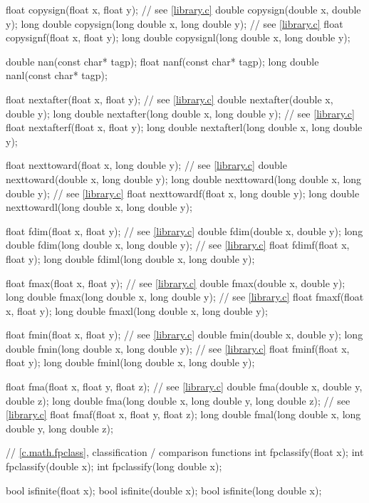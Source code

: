 \begin{codeblock}
{  float copysign(float x, float y);  // see \ref{library.c}
  double copysign(double x, double y);
  long double copysign(long double x, long double y);  // see \ref{library.c}
  float copysignf(float x, float y);
  long double copysignl(long double x, long double y);

  double nan(const char* tagp);
  float nanf(const char* tagp);
  long double nanl(const char* tagp);

  float nextafter(float x, float y);  // see \ref{library.c}
  double nextafter(double x, double y);
  long double nextafter(long double x, long double y);  // see \ref{library.c}
  float nextafterf(float x, float y);
  long double nextafterl(long double x, long double y);

  float nexttoward(float x, long double y);  // see \ref{library.c}
  double nexttoward(double x, long double y);
  long double nexttoward(long double x, long double y);  // see \ref{library.c}
  float nexttowardf(float x, long double y);
  long double nexttowardl(long double x, long double y);

  float fdim(float x, float y);  // see \ref{library.c}
  double fdim(double x, double y);
  long double fdim(long double x, long double y);  // see \ref{library.c}
  float fdimf(float x, float y);
  long double fdiml(long double x, long double y);

  float fmax(float x, float y);  // see \ref{library.c}
  double fmax(double x, double y);
  long double fmax(long double x, long double y);  // see \ref{library.c}
  float fmaxf(float x, float y);
  long double fmaxl(long double x, long double y);

  float fmin(float x, float y);  // see \ref{library.c}
  double fmin(double x, double y);
  long double fmin(long double x, long double y);  // see \ref{library.c}
  float fminf(float x, float y);
  long double fminl(long double x, long double y);

  float fma(float x, float y, float z);  // see \ref{library.c}
  double fma(double x, double y, double z);
  long double fma(long double x, long double y, long double z);  // see \ref{library.c}
  float fmaf(float x, float y, float z);
  long double fmal(long double x, long double y, long double z);

  // \ref{c.math.fpclass}, classification / comparison functions
  int fpclassify(float x);
  int fpclassify(double x);
  int fpclassify(long double x);

  bool isfinite(float x);
  bool isfinite(double x);
  bool isfinite(long double x);

}
\end{codeblock}
